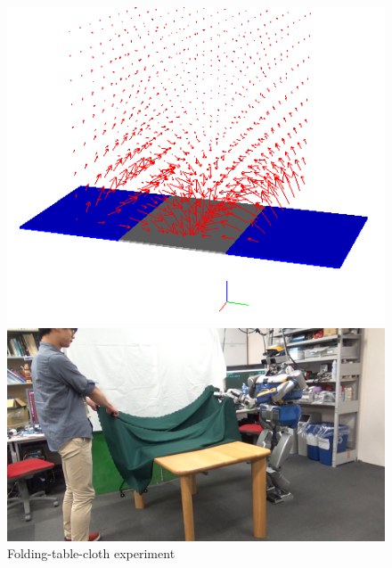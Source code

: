 \vspace{-5mm}
\begin{figure}[htbp]
  \begin{minipage}{0.4\hsize}
    \begin{center}
      \includegraphics[width=1.00\columnwidth]{figs/electronic-potential-table-4.png}
    \end{center}
  \end{minipage}
  \begin{minipage}{0.55\hsize}
    \begin{center}
      \includegraphics[width=1.00\columnwidth]{figs/image_fold.png}
    \end{center}
  \end{minipage}
  \caption{Folding-table-cloth experiment}
  \label{figure:folding}
\end{figure}
\vspace{-4mm}

